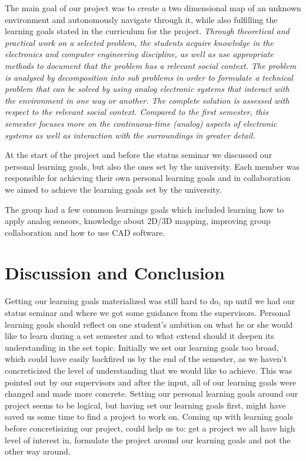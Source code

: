 The main goal of our project was to create a two dimensional map of an unknown environment and autonomously navigate through it, while also fulfilling the learning goals stated in the curriculum for the project.
\textit{Through theoretical and practical work on a selected problem, the
students acquire knowledge in the electronics and computer engineering
discipline, as well as use appropriate methods to document that the
problem has a relevant social context. The problem is analysed by
decomposition into sub problems in order to formulate a technical
problem that can be solved by using analog electronic systems that
interact with the environment in one way or another. The complete
solution is assessed with respect to the relevant social context. Compared
to the first semester, this semester focuses more on the continuous-time
(analog) aspects of electronic systems as well as interaction with the
surroundings in greater detail.}

At the start of the project and before the status seminar we discussed our personal learning goals, but also the ones set by the university. Each member was responsible for achieving their own personal learning goals and in collaboration we aimed to achieve the learning goals set by the university.

The group had a few common learnings goals which included learning how to apply analog sensors, knowledge about 2D/3D mapping, improving group collaboration and how to use CAD software.

\section{Discussion and Conclusion}

Getting our learning goals materialized was still hard to do, up until we had our status seminar and where we got some guidance from the supervisors. Personal learning goals should reflect on one student's ambition on what he or she would like to learn during a set semester and to what extend should it deepen its understanding in the set topic. Initially we set our learning goals too broad, which could have easily backfired us by the end of the semester, as we haven't concreticized the level of understanding that we would like to achieve. This was pointed out by our supervisors and after the input, all of our learning goals were changed and made more concrete. Setting our personal learning goals around our project seems to be logical, but having set our learning goals first, might have saved us some time to find a project to work on. Coming up with learning goals before concretisizing our project, could help us to: get a project we all have high level of interest in, formulate the project around our learning goals and not the other way around. 


